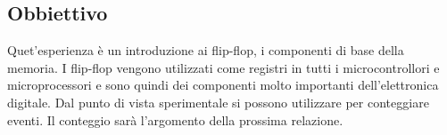 \subsection{Obbiettivo}

Quet'esperienza è un introduzione ai flip-flop, i componenti di base della memoria.
I flip-flop vengono utilizzati come registri in tutti i microcontrollori e microprocessori
e sono quindi dei componenti molto importanti dell'elettronica digitale.
Dal punto di vista sperimentale si possono utilizzare per conteggiare eventi.
Il conteggio sarà l'argomento della prossima relazione.
